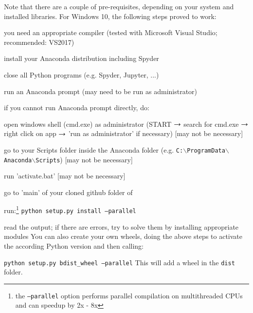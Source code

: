 %


\label{sec:build:windows}
Note that there are a couple of pre-requisites, depending on your system and installed libraries. For Windows 10, the following steps proved to work:
\bi
  \item you need an appropriate compiler (tested with Microsoft Visual Studio; recommended: VS2017)
  \item install your Anaconda distribution including Spyder
  \item close all Python programs (e.g. Spyder, Jupyter, ...) 
  \item run an Anaconda prompt (may need to be run as administrator)
  \item if you cannot run Anaconda prompt directly, do:
  \bi
    \item open windows shell (cmd.exe) as administrator (START $\rightarrow$ search for cmd.exe $\rightarrow$ right click on app $\rightarrow$ 'run as administrator' if necessary) [may not be necessary]
    \item go to your Scripts folder inside the Anaconda folder (e.g. \texttt{C:$\backslash$ProgramData$\backslash$Anaconda$\backslash$Scripts}) [may not be necessary]
    \item run 'activate.bat' [may not be necessary]
  \ei
  \item go to 'main' of your cloned github folder of \codeName\ 
  \item run:\footnote{the \texttt{--parallel} option performs parallel compilation on multithreaded CPUs and can speedup by 2x - 8x} \texttt{python setup.py install --parallel}
  \item read the output; if there are errors, try to solve them by installing appropriate modules
\ei
You can also create your own wheels, doing the above steps to activate the according Python version and then calling:
\bi
  \item[] \texttt{python setup.py bdist\_wheel --parallel}
\ei
This will add a wheel in the \texttt{dist} folder.

